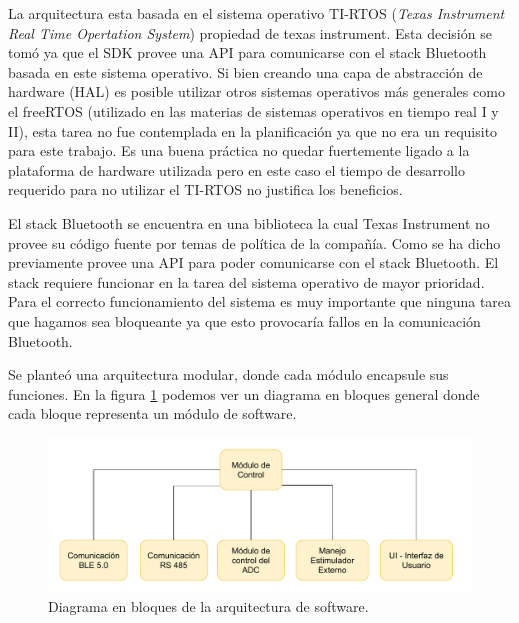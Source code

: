 
La arquitectura esta basada en el sistema operativo TI-RTOS (\textit{Texas Instrument Real Time Opertation System}) propiedad de texas instrument. Esta decisión se tomó ya que el SDK provee una API para comunicarse con el stack Bluetooth basada en este sistema operativo. Si bien creando una capa de abstracción de hardware (HAL) es posible utilizar otros sistemas operativos más generales como el freeRTOS (utilizado en las materias de sistemas operativos en tiempo real I y II), esta tarea no fue contemplada en la planificación ya que no era un requisito para este trabajo. Es una buena práctica no quedar fuertemente ligado a la plataforma de hardware utilizada pero en este caso el tiempo de desarrollo requerido para no utilizar el TI-RTOS no justifica los beneficios.

El stack Bluetooth se encuentra en una biblioteca la cual Texas Instrument no provee su código fuente por temas de política de la compañía. Como se ha dicho previamente provee una API para poder comunicarse con el stack Bluetooth. El stack requiere funcionar en la tarea del sistema operativo de mayor prioridad. Para el correcto funcionamiento del sistema es muy importante que ninguna tarea que hagamos sea bloqueante ya que esto provocaría fallos en la comunicación Bluetooth.

Se planteó una arquitectura modular, donde cada módulo encapsule sus funciones. En la figura \ref{fig:DiagramaEnBloquesArquitectura} podemos ver un diagrama en bloques general donde cada bloque representa un módulo de software.


\vspace{1cm}
\begin{figure}[htbp]
	\centering
	\includegraphics[width=1\textwidth]{./Figures/ArquitecturaSoftware.pdf}
	\caption{Diagrama en bloques de la arquitectura de software.}
	\label{fig:DiagramaEnBloquesArquitectura}
\end{figure}
\vspace{1cm}

